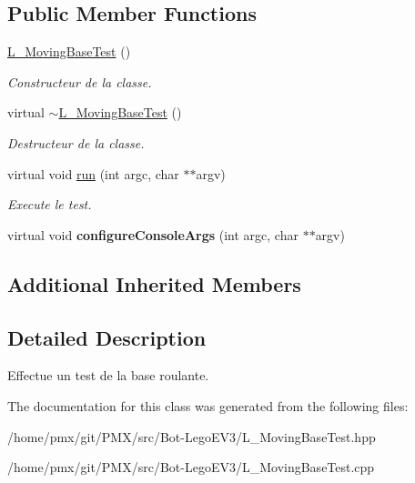 \subsection*{Public Member Functions}
\begin{DoxyCompactItemize}
\item 
\mbox{\label{classL__MovingBaseTest_a605ff9016b8071415e324186a9d872af}} 
\hyperlink{classL__MovingBaseTest_a605ff9016b8071415e324186a9d872af}{L\+\_\+\+Moving\+Base\+Test} ()
\begin{DoxyCompactList}\small\item\em Constructeur de la classe. \end{DoxyCompactList}\item 
\mbox{\label{classL__MovingBaseTest_ae7161cee9852832c6ec2531aaaeb6757}} 
virtual \hyperlink{classL__MovingBaseTest_ae7161cee9852832c6ec2531aaaeb6757}{$\sim$\+L\+\_\+\+Moving\+Base\+Test} ()
\begin{DoxyCompactList}\small\item\em Destructeur de la classe. \end{DoxyCompactList}\item 
\mbox{\label{classL__MovingBaseTest_a2d0a96c01d9852b952a399362d7c990b}} 
virtual void \hyperlink{classL__MovingBaseTest_a2d0a96c01d9852b952a399362d7c990b}{run} (int argc, char $\ast$$\ast$argv)
\begin{DoxyCompactList}\small\item\em Execute le test. \end{DoxyCompactList}\item 
\mbox{\label{classL__MovingBaseTest_a39b33744e15ca551dcb8648304f89c7a}} 
virtual void {\bfseries configure\+Console\+Args} (int argc, char $\ast$$\ast$argv)
\end{DoxyCompactItemize}
\subsection*{Additional Inherited Members}


\subsection{Detailed Description}
Effectue un test de la base roulante. 

The documentation for this class was generated from the following files\+:\begin{DoxyCompactItemize}
\item 
/home/pmx/git/\+P\+M\+X/src/\+Bot-\/\+Lego\+E\+V3/L\+\_\+\+Moving\+Base\+Test.\+hpp\item 
/home/pmx/git/\+P\+M\+X/src/\+Bot-\/\+Lego\+E\+V3/L\+\_\+\+Moving\+Base\+Test.\+cpp\end{DoxyCompactItemize}
